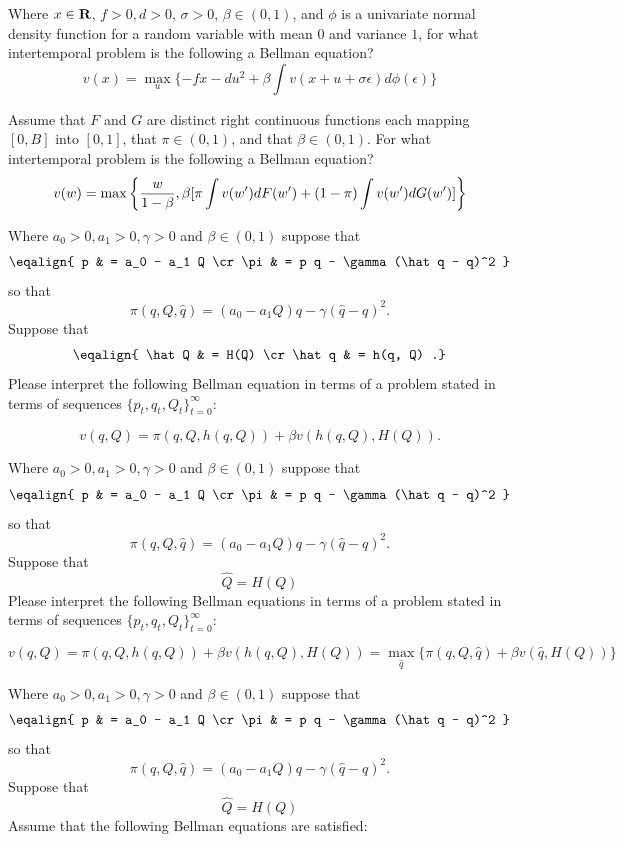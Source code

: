 \medskip
{} Where $x \in {\bf R}$, $f >0, d >0 $, $\sigma >0$,    $\beta \in (0,1)$, and $\phi$ is a univariate normal density function for a random
variable with mean $0$ and variance $1$, for what intertemporal problem is the following  a Bellman equation?
$$ v(x) = \max_{u} \{ - f x - d u^2 + \beta \int v(x +u + \sigma \epsilon) d \phi(\epsilon) \} $$



\medskip



  Assume that  $F$ and $G$ are distinct  right continuous functions each mapping $[0, B]$ into $[0,1]$, that $\pi \in (0,1)$, and  that $\beta \in (0,1)$. For what intertemporal problem is the following a Bellman equation?
$$ v(w) = \max\left\{ {w\over{1-\beta}},  \beta [  \pi \int v(w') d F(w') + (1-\pi) \int v(w') d G(w') ]  \right\} $$


\medskip

 Where $a_0 >0, a_1> 0, \gamma > 0$ and $\beta \in (0,1)$ suppose that
$$\eqalign{ p & = a_0 - a_1 Q \cr
           \pi &  = p q - \gamma(\hat q - q)^2 } $$
so that
$$ \pi(q, Q, \hat q) = (a_0 - a_1 Q)  q - \gamma (\hat q - q)^2 .$$
Suppose that
$$ \eqalign{ \hat Q & = H(Q) \cr
            \hat q & = h(q, Q) .} $$
Please interpret the following Bellman equation in terms of a problem stated in terms of sequences  $\{p_t, q_t, Q_t\}_{t=0}^\infty$:

$$ v(q, Q) = \pi(q,Q, h(q,Q)) + \beta v\left(h(q,Q), H(Q)\right) .$$

\medskip


 Where $a_0 >0, a_1> 0, \gamma > 0$ and $\beta \in (0,1)$ suppose that
$$\eqalign{ p & = a_0 - a_1 Q \cr
           \pi &  = p q - \gamma(\hat q - q)^2 } $$
so that
$$ \pi(q, Q, \hat q) = (a_0 - a_1 Q) q - \gamma (\hat q - q)^2 .$$
Suppose that
$$ \hat Q  = H(Q)  $$
Please interpret the following Bellman equations in terms of a problem stated in terms of sequences  $\{p_t, q_t, Q_t\}_{t=0}^\infty$:

$$v(q, Q)  = \pi(q,Q, h(q, Q) ) + \beta v\left(h(q,Q) ,
H(Q)\right)  = \max_{\hat q} \{\pi(q, Q, \hat q) + \beta v(\hat q, H(Q) )   \} 
$$

\medskip

 Where $a_0 >0, a_1> 0, \gamma > 0$ and $\beta \in (0,1)$ suppose that
$$\eqalign{ p & = a_0 - a_1 Q \cr
           \pi &  = p q - \gamma(\hat q - q)^2 } $$
so that
$$ \pi(q, Q, \hat q) = (a_0 - a_1 Q) q- \gamma (\hat q - q)^2 .$$
Suppose that
$$ \hat Q  = H(Q)  $$
Assume that the following Bellman equations are satisfied: %

